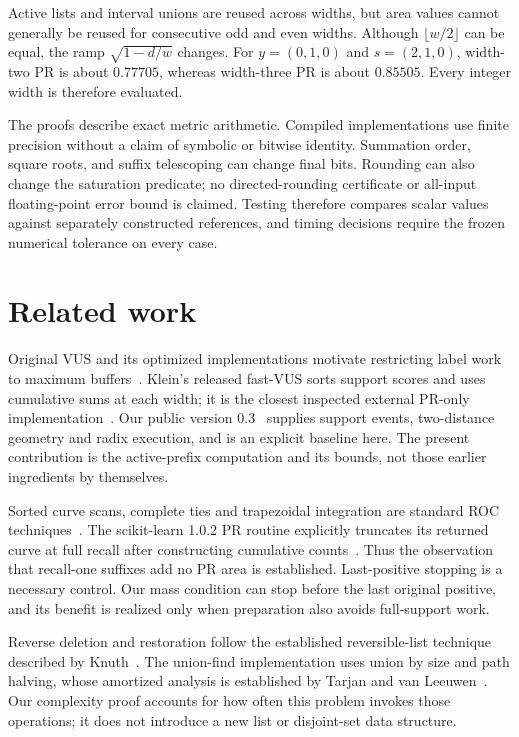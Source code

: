 Active lists and interval unions are reused across widths, but area values
cannot generally be reused for consecutive odd and even widths. Although
$\lfloor w/2\rfloor$ can be equal, the ramp $\sqrt{1-d/w}$ changes. For
$y=(0,1,0)$ and $s=(2,1,0)$, width-two PR is about $0.77705$, whereas
width-three PR is about $0.85505$. Every integer width is therefore evaluated.

The proofs describe exact metric arithmetic. Compiled implementations use
finite precision without a claim of symbolic or bitwise identity. Summation
order, square roots, and suffix telescoping can change final bits. Rounding
can also change the saturation predicate; no directed-rounding certificate
or all-input floating-point error bound is claimed. Testing
therefore compares scalar values against separately constructed references,
and timing decisions require the frozen numerical tolerance on every case.

\section{Related work}
Original VUS and its optimized implementations motivate restricting label
work to maximum buffers~\cite{paparrizos2022,boniol2025}. Klein's released
fast-VUS sorts support scores and uses cumulative sums at each width; it is
the closest inspected external PR-only implementation~\cite{klein2026}.
Our public version 0.3~\cite{sparsevus03} supplies support events, two-distance geometry and
radix execution, and is an explicit baseline here. The present contribution
is the active-prefix computation and its bounds, not those earlier
ingredients by themselves.

Sorted curve scans, complete ties and trapezoidal integration are standard
ROC techniques~\cite{fawcett2006}. The scikit-learn 1.0.2 PR routine explicitly
truncates its returned curve at full recall after constructing cumulative
counts~\cite{sklearn102}. Thus the observation that recall-one suffixes add
no PR area is established. Last-positive stopping is a necessary control.
Our mass condition can stop before the last original positive, and its
benefit is realized only when preparation also avoids full-support work.

Reverse deletion and restoration follow the established reversible-list
technique described by Knuth~\cite{knuth2000}. The union-find implementation
uses union by size and path halving, whose amortized analysis is established
by Tarjan and van Leeuwen~\cite{tarjan1984}. Our complexity proof accounts
for how often this problem invokes those operations; it does not introduce
a new list or disjoint-set data structure.

